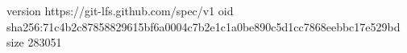 version https://git-lfs.github.com/spec/v1
oid sha256:71c4b2c87858829615bf6a0004c7b2e1c1a0be890c5d1cc7868eebbc17e529bd
size 283051
